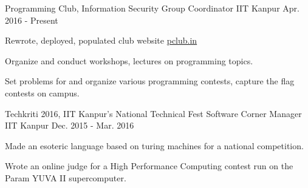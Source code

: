 


\begin{cventries}

  \cventry
  {Programming Club, Information Security Group}
  {Coordinator}
  {IIT Kanpur}
  {Apr. 2016 - Present}
  {
    \begin{cvitems}
    \item Rewrote, deployed, populated club website \href{http://pclub.in}{pclub.in}
    \item Organize and conduct workshops, lectures on programming topics.
    \item Set problems for and organize various programming contests,
      capture the flag contests on campus.
    \end{cvitems}
  }

  \cventry
  {Techkriti 2016, IIT Kanpur's National Technical Fest}
  {Software Corner Manager}
  {IIT Kanpur}
  {Dec. 2015 - Mar. 2016}
  {
    \begin{cvitems}
    \item Made an esoteric language based on turing machines for a
      national competition.
    \item Wrote an online judge for a High Performance Computing
      contest run on the Param YUVA II supercomputer.
    \end{cvitems}
  }

\end{cventries}


